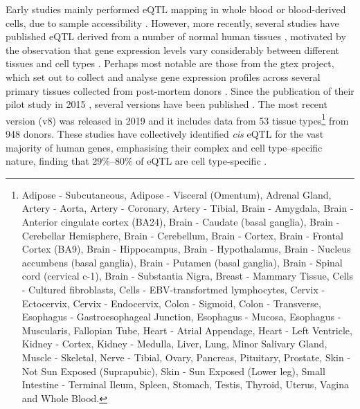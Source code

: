 Early studies mainly performed eQTL mapping in whole blood or blood-derived cells, due to sample accessibility \cite{stranger2007population, pickrell2010understanding}.
However, more recently, several studies have published eQTL derived from a number of normal human tissues \cite{myers2007survey, zhong2010liver,fu2012unraveling, nica2011architecture, dimas2009common, fairfax2012genetics, stranger2012patterns, schadt2008mapping, hao2012lung, innocenti2011identification}, motivated by the observation that gene expression levels vary considerably between different tissues and cell types \cite{su2002large}.
Perhaps most notable are those from the \gls{gtex} project, which set out to collect and analyse gene expression profiles across several primary tissues collected from post-mortem donors \cite{lonsdale2013genotype}.
Since the publication of their pilot study in 2015 \cite{gtex2015genotype}, several versions have been published \cite{gtex2017genetic, aguet2019gtex}.
The most recent version (v8) was released in 2019 and it includes data from 53 tissue types\footnote{Adipose - Subcutaneous, Adipose - Visceral (Omentum), Adrenal Gland, Artery - Aorta, Artery - Coronary, Artery - Tibial, 
Brain - Amygdala, Brain - Anterior cingulate cortex (BA24), Brain - Caudate (basal ganglia), Brain - Cerebellar Hemisphere, Brain - Cerebellum, Brain - Cortex, Brain - Frontal Cortex (BA9), Brain - Hippocampus, Brain - Hypothalamus, Brain - Nucleus accumbens (basal ganglia), Brain - Putamen (basal ganglia), Brain - Spinal cord (cervical c-1), Brain - Substantia Nigra, 
Breast - Mammary Tissue, Cells - Cultured fibroblasts, Cells - EBV-transfortmed lymphocytes,  Cervix - Ectocervix, Cervix - Endocervix, Colon - Sigmoid, Colon - Transverse, Esophagus - Gastroesophageal Junction, Esophagus - Mucosa, Esophagus - Muscularis, Fallopian Tube, Heart - Atrial Appendage, Heart - Left Ventricle, Kidney - Cortex, Kidney - Medulla, Liver, Lung,  Minor Salivary Gland, Muscle - Skeletal, Nerve - Tibial, Ovary, Pancreas, Pituitary, Prostate, Skin - Not Sun Exposed (Suprapubic), Skin - Sun Exposed (Lower leg), Small Intestine - Terminal Ileum, Spleen, Stomach, Testis, Thyroid, Uterus, Vagina and Whole Blood.} from 948 donors.
These studies have collectively identified \textit{cis} eQTL for the vast majority of human genes,
emphasising their complex and cell type–specific nature, finding that 29\%–80\% of eQTL are cell type-specific \cite{gtex2015genotype, nica2011architecture, dimas2009common,  fairfax2012genetics}. \\

